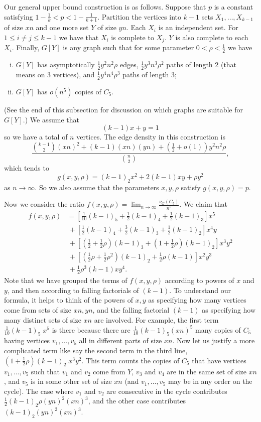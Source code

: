 \documentclass[12pt]{article}
\newcommand{\rbrac}[1]{\left( #1 \right)}
\newcommand{\sbrac}[1]{\left[ #1 \right]}
\theoremstyle{definition}
\theoremstyle{remark}
\renewcommand{\le}{\leqslant}
\begin{document}
Our general upper bound construction is as follows. Suppose that $p$ is a constant satisfying $1-\frac1k < p < 1-\frac1{k+1}$. Partition the vertices into $k-1$ sets $X_1, \ldots, X_{k-1}$ of size $xn$ and one more  set $Y$ of size $yn$. Each $X_i$ is an independent set. For $1 \le i \neq j \le k-1$ we have that $X_i$ is complete to $X_j$. $Y$ is also complete to each $X_i$. Finally, $G[Y]$ is any graph such that for some parameter $0 < \rho < \frac{1}{2}$ we have
\begin{enumerate}[(i)]
\item \label{cond1}$G[Y]$ has asymptotically $\frac12 y^2n^2 \rho$ edges, $\frac12 y^3 n^3 \rho^2$ paths of length 2 (that means on 3 vertices), and $\frac12 y^4n^4 \rho^3$ paths of length 3;
\item \label{cond2}$G[Y]$ has $o(n^5)$ copies of $C_5$.
\end{enumerate}
(See the end of this subsection for discussion on which graphs are suitable for $G[Y]$.)
We assume that 
\[
(k-1)x+y = 1
\]
so we have a total of $n$ vertices. The edge density in this construction is
\[
\frac{\binom{k-1}2 \rbrac{xn}^2 + (k-1)(xn)(yn) + (\frac12+o(1)) y^2n^2 \rho}{\binom{n}{2}}, 
\]
which tends to 
\[
g(x, y, \rho) = (k-1)_2 x^2 + 2(k-1)xy + \rho y^2
\]
as $n \rightarrow \infty$. So we also assume that the parameters $x, y, \rho$ satisfy $g(x, y, \rho) = p$. 

Now we consider the ratio $f(x, y, \rho) = \lim_{n\to\infty} \frac{\nu_G(C_5)}{n^5}$.
We claim that
\begin{align*}
f(x, y, \rho)&=  \sbrac{\frac1{10} (k-1)_5 + \frac12 (k-1)_4 + \frac12 (k-1)_3} x^5\\ 
&\,+ \sbrac{ \frac12(k-1)_4 + \frac32 (k-1)_3 +  \frac12(k-1)_2} x^4 y\\
&\,+ \sbrac{ \rbrac{\frac12 + \frac12 \rho}(k-1)_3 + \rbrac{1 + \frac12 \rho}(k-1)_2    } x^3 y^2\\
&\,+ \sbrac{\rbrac{\frac12 \rho+ \frac12 \rho^2}(k-1)_2  + \frac12 \rho(k-1) } x^2 y^3 \\
&\,+ \frac12 \rho^3 (k-1) x y^4.
\end{align*}
Note that we have grouped the terms of $f(x, y, \rho)$ according to powers of $x$ and $y$, and then according to falling factorials of $(k-1)$. To understand our formula, it helps to think of the powers of $x,y$ as specifying how many vertices come from sets of size $xn, yn$, and the falling factorial $(k-1)$ as specifying how many distinct sets of size $xn$ are involved. For example, the first term $\frac1{10} (k-1)_5 \; x^5$ is there because there are $\frac1{10} (k-1)_5 (xn)^5$ many copies of $C_5$ having vertices $v_1, \ldots, v_5$ all in different parts of size $xn$. Now let us justify a more complicated term like say the second term in the third line, $ \rbrac{1+\frac12 \rho}(k-1)_2\; x^3y^2 $. This term counts the copies of $C_5$ that have vertices $v_1, \ldots, v_5$ such that $v_1$ and $v_2$ come from $Y$, $v_3$ and $v_4$ are in the same set of size $xn$, and $v_5$ is in some other set of size $xn$ (and $v_1, \ldots, v_5$ may be in any order on the cycle). The case where $v_1$ and $v_2$ are consecutive in the cycle contributes $\frac12 (k-1)_2 \rho (yn)^2(xn)^3$, and the other case contributes $(k-1)_2 (yn)^2(xn)^3$.
\end{document}
